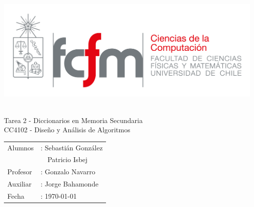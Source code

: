 \documentclass[14pt,letterpaper,hidelinks]{extarticle}
\begin{document}
\thispagestyle{empty}
\renewcommand*\listtablename{Índice de tablas}
\renewcommand{\contentsname}{\'Indice}
\renewcommand*{\refname}{}

\newpage
\pagestyle{fancy}
\fancyhf{}
\hbox{\includegraphics[scale=0.3]{img/fcfm_dcc_png.png} }
\vspace*{4cm}
\begin{center}
\Huge  {Tarea 2 - Diccionarios en Memoria Secundaria}\\
\vspace{1cm}
\Large {CC4102 - Diseño y Análisis de Algoritmos}\\
\end{center}

\vfill
\begin{flushright}
\begin{table}[h]
	\large
  \raggedleft
	\begin{tabular}{ll}
		Alumnos&: Sebastián González\\
				&\ \ Patricio Isbej\\
		Profesor&: Gonzalo Navarro\\
		Auxiliar&: Jorge Bahamonde\\
		Fecha&: \today
	\end{tabular}
\end{table}
\end{flushright}

\newpage
\pagestyle{fancy}
\fancyhf{}

\fancyhead[R]{\small \rm \textbf{\thepage}} %


\end{document}
